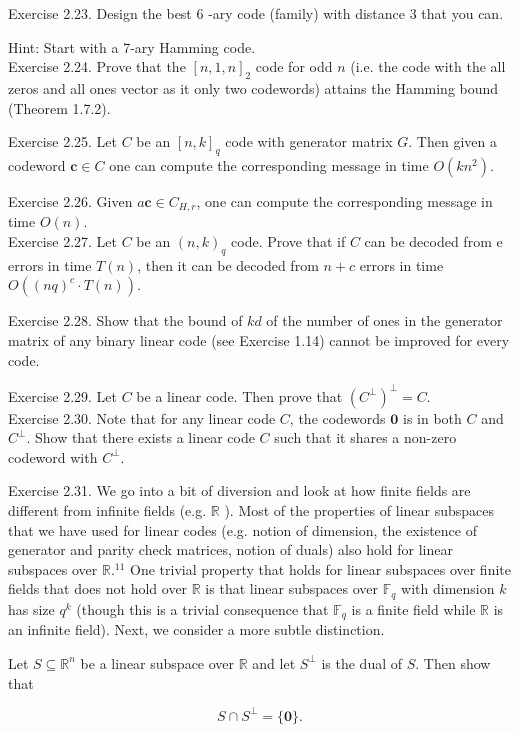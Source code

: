 \documentclass[10pt]{article}
\begin{document}
Exercise 2.23. Design the best 6 -ary code (family) with distance 3 that you can.

Hint: Start with a 7-ary Hamming code.\\
Exercise 2.24. Prove that the $[n, 1, n]_{2}$ code for odd $n$ (i.e. the code with the all zeros and all ones vector as it only two codewords) attains the Hamming bound (Theorem 1.7.2).

Exercise 2.25. Let $C$ be an $[n, k]_{q}$ code with generator matrix $G$. Then given a codeword $\mathbf{c} \in C$ one can compute the corresponding message in time $O\left(k n^{2}\right)$.

Exercise 2.26. Given $a \mathbf{c} \in C_{H, r}$, one can compute the corresponding message in time $O(n)$.\\
Exercise 2.27. Let $C$ be an $(n, k)_{q}$ code. Prove that if $C$ can be decoded from e errors in time $T(n)$, then it can be decoded from $n+c$ errors in time $O\left((n q)^{c} \cdot T(n)\right)$.

Exercise 2.28. Show that the bound of $k d$ of the number of ones in the generator matrix of any binary linear code (see Exercise 1.14) cannot be improved for every code.

Exercise 2.29. Let $C$ be a linear code. Then prove that $\left(C^{\perp}\right)^{\perp}=C$.\\
Exercise 2.30. Note that for any linear code $C$, the codewords $\mathbf{0}$ is in both $C$ and $C^{\perp}$. Show that there exists a linear code $C$ such that it shares a non-zero codeword with $C^{\perp}$.

Exercise 2.31. We go into a bit of diversion and look at how finite fields are different from infinite fields (e.g. $\mathbb{R}$ ). Most of the properties of linear subspaces that we have used for linear codes (e.g. notion of dimension, the existence of generator and parity check matrices, notion of duals) also hold for linear subspaces over $\mathbb{R} .^{11}$ One trivial property that holds for linear subspaces over finite fields that does not hold over $\mathbb{R}$ is that linear subspaces over $\mathbb{F}_{q}$ with dimension $k$ has size $q^{k}$ (though this is a trivial consequence that $\mathbb{F}_{q}$ is a finite field while $\mathbb{R}$ is an infinite field). Next, we consider a more subtle distinction.

Let $S \subseteq \mathbb{R}^{n}$ be a linear subspace over $\mathbb{R}$ and let $S^{\perp}$ is the dual of $S$. Then show that

$$
S \cap S^{\perp}=\{\mathbf{0}\} .
$$
\end{document}
